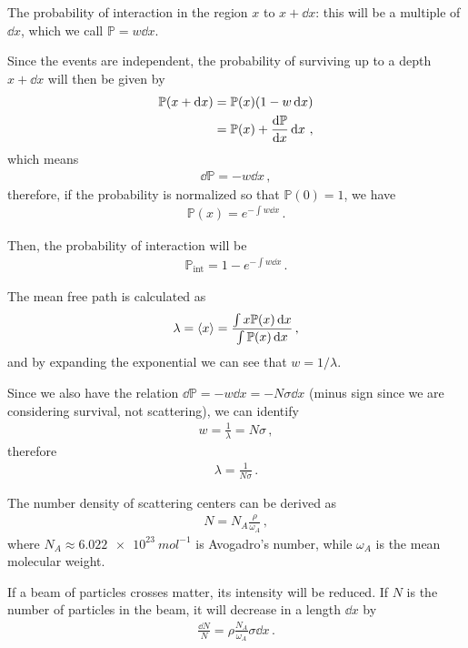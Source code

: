 \documentclass[main.tex]{subfiles}
\begin{document}
The probability of interaction in the region \(x\) to \(x + \dd{x}\): this will be a multiple of \(\dd{x}\), which we call \(\mathbb{P} =  w \dd{x}\).

Since the events are independent,
the probability of surviving up to a depth \(x + \dd{x}\) will then be given by 
%
\begin{subequations}
\begin{align}
\mathbb{P} (x + \dd{x}) &= 
\mathbb{P} (x) (1 - w \dd{x})  \\
&= \mathbb{P} (x) + \dv{\mathbb{P} }{x} \dd{x}
\,,
\end{align}
\end{subequations}
%
which means 
%
\begin{align}
\dd{\mathbb{P}} = - w \dd{x}
\,,
\end{align}
%
therefore, if the probability is normalized so that \(\mathbb{P}(0) =1\), we have 
%
\begin{align}
\mathbb{P}(x) =  e^{- \int w \dd{x}}
\,.
\end{align}

Then, the probability of interaction will be 
%
\begin{align}
\mathbb{P} _{\text{int}} = 1 - e^{- \int w \dd{x}}
\,.
\end{align}

The mean free path is calculated as 
%
\begin{align}
\lambda  = \expval{x} = \frac{\int x \mathbb{P} (x) \dd{x}}{\int \mathbb{P} (x) \dd{x}}
\,,
\end{align}
%
and by expanding the exponential we can see that \(w = 1 / \lambda \). 

Since we also have the relation \(\dd{\mathbb{P} } = - w \dd{x} = -N \sigma \dd{x}\) (minus sign since we are considering survival, not scattering), we can identify 
%
\begin{align}
w = \frac{1}{\lambda } = N \sigma 
\,,
\end{align}
%
therefore 
%
\begin{align}
\lambda = \frac{1}{N \sigma }
\,.
\end{align}

The number density of scattering centers can be derived as 
%
\begin{align}
N = N_A \frac{\rho }{\omega_{A}}
\,,
\end{align}
%
where \(N_A \approx \SI{6.022e23}{mol^{-1}}\) is Avogadro's number, while \(\omega_{A}\) is the mean molecular weight.

If a beam of particles crosses matter, its intensity will be reduced. If \(N\) is the number of particles in the beam, it will decrease in a length \(\dd{x}\) by 
%
\begin{align}
\frac{\dd{N}}{N} = \rho \frac{N_A}{\omega_{A}} \sigma \dd{x}  
\,.
\end{align}
\end{document}
